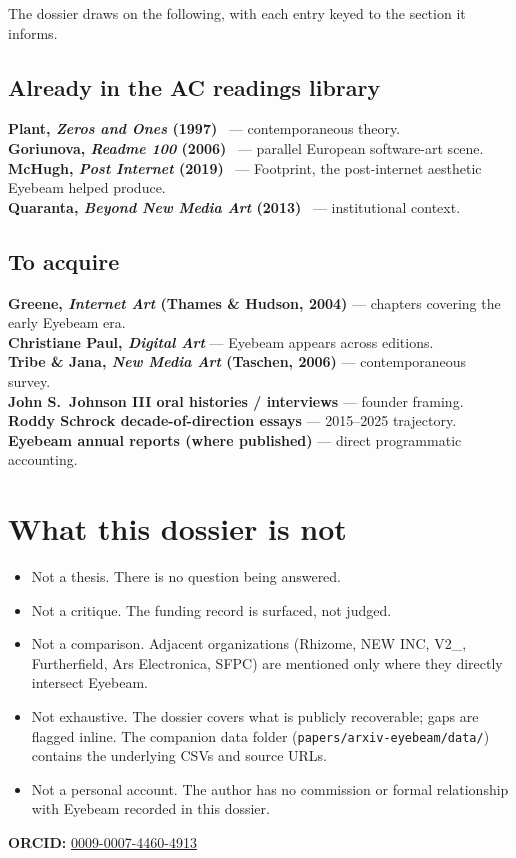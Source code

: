 \documentclass[10pt,letterpaper,twocolumn]{article}
\begin{document}
The dossier draws on the following, with each entry keyed to the section it informs.

\subsection{Already in the AC readings library}

\textbf{Plant, \emph{Zeros and Ones} (1997)}~\citep{plant1997zeros} --- contemporaneous theory.\\
\textbf{Goriunova, \emph{Readme 100} (2006)}~\citep{goriunova2006readme} --- parallel European software-art scene.\\
\textbf{McHugh, \emph{Post Internet} (2019)}~\citep{mchugh2019post} --- Footprint, the post-internet aesthetic Eyebeam helped produce.\\
\textbf{Quaranta, \emph{Beyond New Media Art} (2013)}~\citep{quaranta2013beyond} --- institutional context.

\subsection{To acquire}

\textbf{Greene, \emph{Internet Art} (Thames \& Hudson, 2004)} --- chapters covering the early Eyebeam era.\\
\textbf{Christiane Paul, \emph{Digital Art}} --- Eyebeam appears across editions.\\
\textbf{Tribe \& Jana, \emph{New Media Art} (Taschen, 2006)} --- contemporaneous survey.\\
\textbf{John S.~Johnson III oral histories / interviews} --- founder framing.\\
\textbf{Roddy Schrock decade-of-direction essays} --- 2015--2025 trajectory.\\
\textbf{Eyebeam annual reports (where published)} --- direct programmatic accounting.

\section{What this dossier is not}

\begin{itemize}
  \item Not a thesis. There is no question being answered.
  \item Not a critique. The funding record is surfaced, not judged.
  \item Not a comparison. Adjacent organizations (Rhizome, NEW INC, V2\_, Furtherfield, Ars Electronica, SFPC) are mentioned only where they directly intersect Eyebeam.
  \item Not exhaustive. The dossier covers what is publicly recoverable; gaps are flagged inline. The companion data folder (\texttt{papers/arxiv-eyebeam/data/}) contains the underlying CSVs and source URLs.
  \item Not a personal account. The author has no commission or formal relationship with Eyebeam recorded in this dossier.
\end{itemize}

\vspace{0.5em}
\noindent\textbf{ORCID:} \href{https://orcid.org/0009-0007-4460-4913}{0009-0007-4460-4913}



\end{document}
